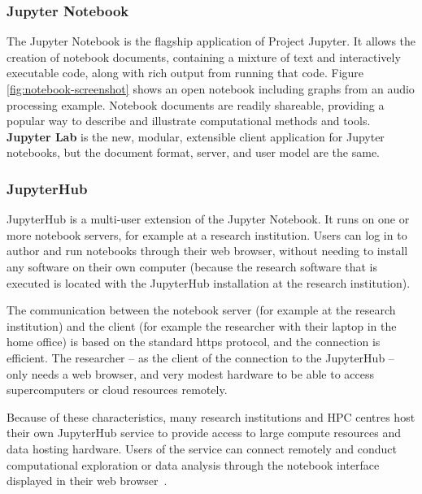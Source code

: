 \subsubsection{Jupyter Notebook}\label{sec:jupyter-notebook} The Jupyter Notebook is
the flagship application of Project Jupyter.
It allows the creation of notebook documents, containing a mixture of text and
interactively executable code, along with rich output from running that code.
Figure \ref{fig:notebook-screenshot} shows an open notebook including graphs
from an audio processing example. Notebook documents are readily shareable,
providing a popular way to describe and illustrate computational methods and
tools.  \textbf{Jupyter Lab} is the new, modular, extensible
client application for Jupyter notebooks, but the document format, server, and
user model are the same.

\subsubsection{JupyterHub}\label{sec:jupyterhub} JupyterHub is a multi-user extension of the Jupyter Notebook.
It runs on one or more notebook servers, for example at a research institution.
Users can log in to author and run notebooks through their web browser, without
needing to install any software on their own computer (because the research
software that is executed is located with the JupyterHub installation at the
research institution).

The communication between the notebook server (for example at the research
institution) and the client (for example the researcher with their laptop in the
home office) is based on the standard https protocol, and the connection is
efficient. The researcher -- as the client of the connection to the JupyterHub --
only needs a web browser, and very modest hardware to be able to access
supercomputers or cloud resources remotely.


Because of these characteristics, many research institutions and HPC centres host their own
JupyterHub service to provide access to large compute resources and data hosting
hardware. Users of the service can connect remotely and conduct computational
exploration or data analysis through the notebook interface displayed in their
web browser~\cite{Fangohr2020}.
%


